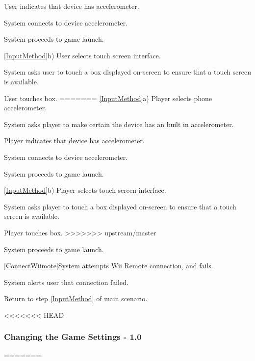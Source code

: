 \documentclass[12pt]{article}
\newenvironment{itemize*}%
  {\begin{itemize}%
  	\setlength{\parsep}{0pt}
    \setlength{\itemsep}{0pt}%
    \setlength{\parskip}{0pt}}%
  {\end{itemize}}
\newenvironment{enumerate*}%
  {\begin{enumerate}%
  	\setlength{\parsep}{0pt}
    \setlength{\itemsep}{0pt}%
    \setlength{\parskip}{0pt}}%
  {\end{enumerate}}
\begin{document}
\begin{itemize*}
\begin{itemize*}
\begin{enumerate*}
\item User indicates that device has accelerometer.
\item System connects to device accelerometer.
\item System proceeds to game launch.
\end{enumerate*}
\ref{InputMethod}b) User selects touch screen interface.
\begin{enumerate*}
\item System asks user to touch a box displayed on-screen to ensure that a touch screen is available.
\item User touches box.
=======
\ref{InputMethod}a) Player selects phone accelerometer.  
\begin{enumerate*}
\item System asks player to make certain the device has an built in accelerometer.
\item Player indicates that device has accelerometer.
\item System connects to device accelerometer.
\item System proceeds to game launch.
\end{enumerate*}
\ref{InputMethod}b) Player selects touch screen interface.
\begin{enumerate*}
\item System asks player to touch a box displayed on-screen to ensure that a touch screen is available.
\item Player touches box.
>>>>>>> upstream/master
\item System proceeds to game launch.
\end{enumerate*}
\ref{ConnectWiimote}System attempts Wii Remote connection, and fails.
\begin{enumerate*}
\item System alerts user that connection failed.
\item Return to step \ref{InputMethod} of main scenario.
\end{enumerate*}

<<<<<<< HEAD
\subsubsection*{Changing the Game Settings - 1.0}
=======

\end{enumerate*}
\end{itemize*}
\end{itemize*}
\end{document}

